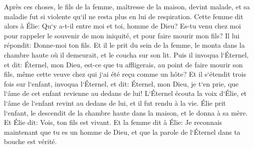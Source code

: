 \verse Après ces choses, le fils de la femme, maîtresse de la maison, devint malade, et sa maladie fut si violente qu`il ne resta plus en lui de respiration. 
\verse Cette femme dit alors à Élie: Qu`y a-t-il entre moi et toi, homme de Dieu? Es-tu venu chez moi pour rappeler le souvenir de mon iniquité, et pour faire mourir mon fils? 
\verse Il lui répondit: Donne-moi ton fils. Et il le prit du sein de la femme, le monta dans la chambre haute où il demeurait, et le coucha sur son lit. 
\verse Puis il invoqua l`Éternel, et dit: Éternel, mon Dieu, est-ce que tu affligerais, au point de faire mourir son fils, même cette veuve chez qui j`ai été reçu comme un hôte? 
\verse Et il s`étendit trois fois sur l`enfant, invoqua l`Éternel, et dit: Éternel, mon Dieu, je t`en prie, que l`âme de cet enfant revienne au dedans de lui! 
\verse L`Éternel écouta la voix d`Élie, et l`âme de l`enfant revint au dedans de lui, et il fut rendu à la vie. 
\verse Élie prit l`enfant, le descendit de la chambre haute dans la maison, et le donna à sa mère. Et Élie dit: Vois, ton fils est vivant. 
\verse Et la femme dit à Élie: Je reconnais maintenant que tu es un homme de Dieu, et que la parole de l`Éternel dans ta bouche est vérité. 

\chapter{}

